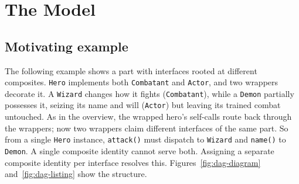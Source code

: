 \documentclass[acmsmall,nonacm]{acmart}
\theoremstyle{acmplain}
\newcommand{\code}[1]{\texttt{#1}}
\begin{document}
\section{The Model}
\label{sec:model}

\subsection{Motivating example}

The following example shows a part with interfaces rooted at different
composites. \code{Hero} implements both \code{Combatant} and \code{Actor},
and two wrappers decorate it. A \code{Wizard} changes how it fights
(\code{Combatant}), while a \code{Demon} partially possesses it, seizing its name
and will (\code{Actor}) but leaving its trained combat untouched. As in the
overview, the wrapped hero's self-calls route back through the wrappers; now two
wrappers claim different interfaces of the same part. So from a single \code{Hero}
instance, \code{attack()} must dispatch to \code{Wizard} and \code{name()}
to \code{Demon}. A single composite identity cannot serve both. Assigning a
separate composite identity per interface resolves this.
Figures~\ref{fig:dag-diagram} and~\ref{fig:dag-listing} show the structure.
\end{document}
